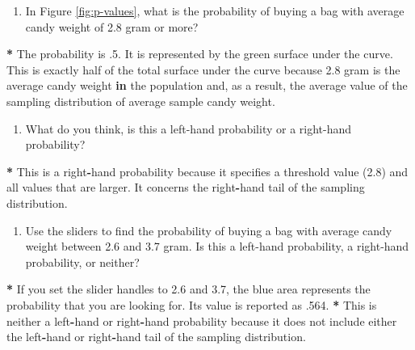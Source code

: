 \documentclass[a4paper]{book}
\newenvironment{Shaded}{\begin{snugshade}}{\end{snugshade}}
\newcommand{\DecValTok}[1]{\textcolor[rgb]{0.00,0.00,0.00}{#1}}
\newcommand{\FloatTok}[1]{\textcolor[rgb]{0.00,0.00,0.00}{#1}}
\newcommand{\StringTok}[1]{\textcolor[rgb]{0.00,0.00,0.00}{#1}}
\newcommand{\ControlFlowTok}[1]{\textcolor[rgb]{0.00,0.00,0.00}{\textbf{#1}}}
\newcommand{\OperatorTok}[1]{\textcolor[rgb]{0.00,0.00,0.00}{\textbf{#1}}}
\newcommand{\NormalTok}[1]{#1}
\providecommand{\tightlist}{%
  \setlength{\itemsep}{0pt}\setlength{\parskip}{0pt}}
\theoremstyle{definition}
\theoremstyle{definition}
\theoremstyle{definition}
\theoremstyle{remark}
\begin{document}
\begin{enumerate}
\def\labelenumi{\arabic{enumi}.}
\tightlist
\item
  In Figure \ref{fig:p-values}, what is the probability of buying a bag
  with average candy weight of 2.8 gram or more?
\end{enumerate}

\begin{Shaded}
\begin{Highlighting}[]
\OperatorTok{*}\StringTok{ }\NormalTok{The probability is .}\DecValTok{5}\NormalTok{. It is represented by the green surface under the}
\NormalTok{curve. This is exactly half of the total surface under the curve because }\FloatTok{2.8}
\NormalTok{gram is the average candy weight }\ControlFlowTok{in}\NormalTok{ the population and, as a result, the}
\NormalTok{average value of the sampling distribution of average sample candy weight.}
\end{Highlighting}
\end{Shaded}

\begin{enumerate}
\def\labelenumi{\arabic{enumi}.}
\setcounter{enumi}{1}
\tightlist
\item
  What do you think, is this a left-hand probability or a right-hand
  probability?
\end{enumerate}

\begin{Shaded}
\begin{Highlighting}[]
\OperatorTok{*}\StringTok{ }\NormalTok{This is a right}\OperatorTok{-}\NormalTok{hand probability because it specifies a threshold value}
\NormalTok{(}\FloatTok{2.8}\NormalTok{) and all values that are larger. It concerns the right}\OperatorTok{-}\NormalTok{hand tail of the}
\NormalTok{sampling distribution.}
\end{Highlighting}
\end{Shaded}

\begin{enumerate}
\def\labelenumi{\arabic{enumi}.}
\setcounter{enumi}{2}
\tightlist
\item
  Use the sliders to find the probability of buying a bag with average
  candy weight between 2.6 and 3.7 gram. Is this a left-hand
  probability, a right-hand probability, or neither?
\end{enumerate}

\begin{Shaded}
\begin{Highlighting}[]
\OperatorTok{*}\StringTok{ }\NormalTok{If you set the slider handles to }\FloatTok{2.6}\NormalTok{ and }\FloatTok{3.7}\NormalTok{, the blue area represents the}
\NormalTok{probability that you are looking for. Its value is reported as .}\DecValTok{564}\NormalTok{.}
\OperatorTok{*}\StringTok{ }\NormalTok{This is neither a left}\OperatorTok{-}\NormalTok{hand or right}\OperatorTok{-}\NormalTok{hand probability because it does not}
\NormalTok{include either the left}\OperatorTok{-}\NormalTok{hand or right}\OperatorTok{-}\NormalTok{hand tail of the sampling distribution.}
\end{Highlighting}
\end{Shaded}
\end{document}
